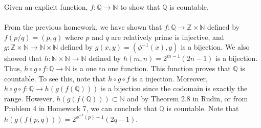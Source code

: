 \documentclass[12pt]{article}
\begin{document}
\problem Given an explicit function, $f: \mathbb{Q} \rightarrow \mathbb{N}$ to show that $\mathbb{Q}$ is countable. \\ \\ 

From the previous homework, we have shown that $f:\mathbb{Q} \rightarrow \mathbb{Z} \times \mathbb{N}$ defined by $f(p/q)= (p,q)$ where $p$ and $q$ are relatively prime is injective, and $g:\mathbb{Z} \times \mathbb{N} \rightarrow \mathbb{N} \times \mathbb{N}$ defined by $g(x,y)= (\phi^{-1}(x),y)$ is a bijection. We also showed that $h: \mathbb{N} \times \mathbb{N} \rightarrow \mathbb{N}$ defined by $h(m,n)= 2^{m-1}(2n-1)$ is a bijection. Thus, $h \circ g \circ f: \mathbb{Q} \rightarrow \mathbb{N}$ is a one to one function. This function proves that $\mathbb{Q}$ is countable. To see this, note that  $h \circ g \circ f$ is a injection. Moreover, $h \circ g \circ f: \mathbb{Q} \rightarrow
h(g(f(\mathbb{Q})))$ is a bijection since the codomain is exactly the range. However, $h(g(f(\mathbb{Q}))) \subset \mathbb{N}$ and by Theorem 2.8 in Rudin, or from Problem 4 in Homework 7, we can conclude that $\mathbb{Q}$ is countable. Note that $h(g(f(p,q))) = 2^{\phi^{-1}(p)-1}(2q-1).$ \\ \\
\end{document}
